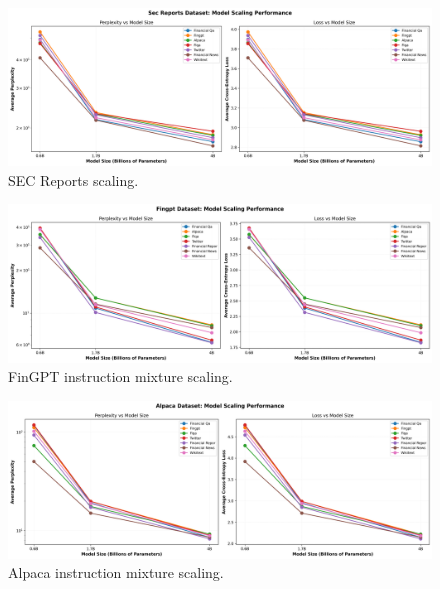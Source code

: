 {\tighttable
}

\begin{figure}[H]
  \centering
  \includegraphics[width=\textwidth]{../thesis/figures/scaling_sec_reports.png}
  \caption{SEC Reports scaling.}\label{fig:scaling_sec_reports}
\end{figure}

{\tighttable
}

\begin{figure}[H]
  \centering
  \includegraphics[width=\textwidth]{../thesis/figures/scaling_fingpt.png}
  \caption{FinGPT instruction mixture scaling.}\label{fig:scaling_fingpt}
\end{figure}

{\tighttable
}

\begin{figure}[H]
  \centering
  \includegraphics[width=\textwidth]{../thesis/figures/scaling_alpaca.png}
  \caption{Alpaca instruction mixture scaling.}\label{fig:scaling_alpaca}
\end{figure}

